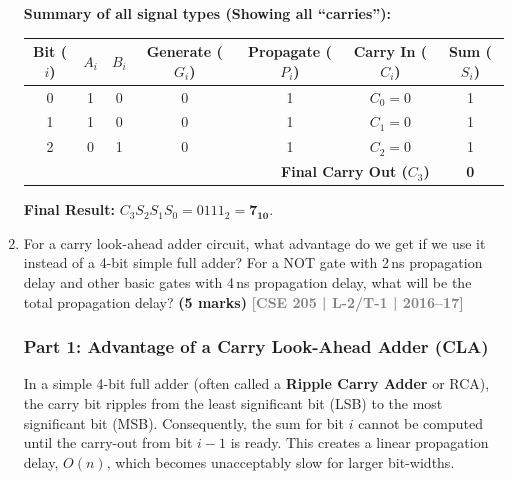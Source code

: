 \documentclass[12pt,a3paper]{article}
\newcommand{\yr}[1]{\hfill\textcolor{gray}{\small\textbf{[#1]}}}
\newcommand{\mk}[1]{\textcolor{orange!70!black}{\small\textbf{(#1 marks)}}}
\begin{document}
\begin{enumerate}
\begin{tcolorbox}[enhanced,breakable,ansbox,colback=cD!4,colframe=cD,boxrule=0.8pt,arc=5pt,title={\textbf{Answer}},fonttitle=\bfseries\color{white},colbacktitle=cD]
\textbf{Summary of all signal types (Showing all ``carries''):}
\begin{center}
\renewcommand{\arraystretch}{1.3}
\begin{tabular}{c c c | c c | c | c}
\toprule
\textbf{Bit ($i$)} & \textbf{$A_i$} & \textbf{$B_i$} & \textbf{Generate ($G_i$)} & \textbf{Propagate ($P_i$)} & \textbf{Carry In ($C_i$)} & \textbf{Sum ($S_i$)} \\
\midrule
0 & 1 & 0 & 0 & 1 & $C_0 = 0$ & 1 \\
1 & 1 & 0 & 0 & 1 & $C_1 = 0$ & 1 \\
2 & 0 & 1 & 0 & 1 & $C_2 = 0$ & 1 \\
\midrule
\multicolumn{6}{r|}{\textbf{Final Carry Out ($C_3$)}} & \textbf{0} \\
\bottomrule
\end{tabular}
\end{center}
\textbf{Final Result:} $C_3 S_2 S_1 S_0 = 0111_2 = \mathbf{7_{10}}$.

\end{tcolorbox}

\item For a carry look-ahead adder circuit, what advantage do we get if we use it instead of a 4-bit simple full adder? For a NOT gate with 2\,ns propagation delay and other basic gates with 4\,ns propagation delay, what will be the total propagation delay?
\mk{5} \yr{CSE 205 | L-2/T-1 | 2016--17}

\begin{tcolorbox}[enhanced,breakable,ansbox,colback=cD!4,colframe=cD,boxrule=0.8pt,arc=5pt,title={\textbf{Answer}},fonttitle=\bfseries\color{white},colbacktitle=cD]

\subsubsection*{Part 1: Advantage of a Carry Look-Ahead Adder (CLA)}

In a simple 4-bit full adder (often called a \textbf{Ripple Carry Adder} or RCA), the carry bit ripples from the least significant bit (LSB) to the most significant bit (MSB). Consequently, the sum for bit $i$ cannot be computed until the carry-out from bit $i-1$ is ready. This creates a linear propagation delay, $O(n)$, which becomes unacceptably slow for larger bit-widths.


\end{tcolorbox}
\end{enumerate}
\end{document}

